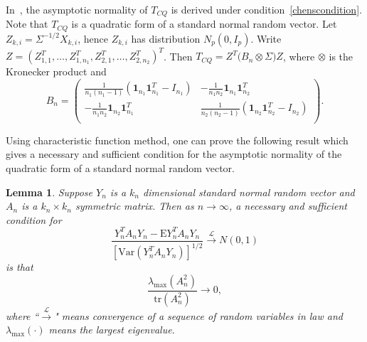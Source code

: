 \documentclass[review]{elsarticle}
\theoremstyle{plain}
\newtheorem{lemma}{\quad\quad Lemma}
\theoremstyle{definition}
\theoremstyle{remark}
\begin{document}
    In~\cite{Chen2010A}, the asymptotic normality of $T_{CQ}$ is derived under condition~\eqref{chenscondition}.
Note that $T_{CQ}$ is a quadratic form of a standard normal random vector.
Let $Z_{k,i}=\Sigma^{-1/2}X_{k,i}$, hence $Z_{k,i}$ has distribution $ N_p(0,I_{p})$.
Write $Z=(Z_{1,1}^T,\ldots,Z_{1,n_1}^T,Z_{2,1}^T,\ldots,Z_{2,n_2}^T)^T$.
    Then 
        $
        T_{CQ}=Z^T \big( B_n\otimes \Sigma \big) Z
        $,
    where $\otimes$ is the Kronecker product and
    \begin{equation*}
        B_n=\begin{pmatrix}
            \frac{1}{n_1(n_1-1)}(\mathbf{1}_{n_1} \mathbf{1}_{n_1}^T-I_{n_1})&
            -\frac{1}{n_1 n_2}\mathbf{1}_{n_1} \mathbf{1}_{n_2}^T\\
            -\frac{1}{n_1 n_2}\mathbf{1}_{n_2} \mathbf{1}_{n_1}^T&
            \frac{1}{n_2(n_2-1)}( \mathbf{1}_{n_2} \mathbf{1}_{n_2}^T-I_{n_2})\\
        \end{pmatrix}.
    \end{equation*}
    
Using characteristic function method, one can prove the following result which gives a necessary and sufficient condition for the asymptotic normality of the quadratic form of a standard normal random vector.
\begin{lemma}\label{quadraticFormCLT}
    Suppose $Y_{n}$ is a $k_n$ dimensional standard normal random vector and $A_n$ is a $k_n\times k_n$ symmetric matrix. Then as $n\to \infty$, a necessary and sufficient condition for
    \begin{equation}\label{quadratic}
        \frac{Y_n^T A_n Y_n-\mathrm{E} Y_n^T A_n Y_n}{{[\mathrm{Var}(Y_n^T A_n Y_n)]}^{1/2}}\xrightarrow{\mathcal{L}}N(0,1)
    \end{equation}
    is that
    \begin{equation}\label{quadraticEigen}
        \frac{\lambda_{\max}(A_n^2)}{\mathrm{tr}(A_n^2)}\to 0,
    \end{equation}
    where ``$\xrightarrow{\mathcal{L}}$" means convergence of a sequence of random variables in law and $\lambda_{\max}(\cdot)$ means the largest eigenvalue.
\end{lemma}
\end{document}
